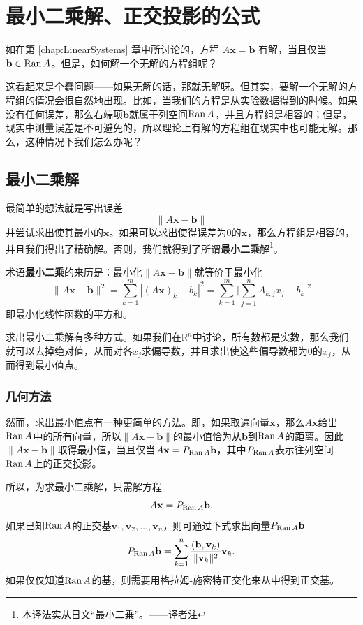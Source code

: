 \section{最小二乘解、正交投影的公式}\label{sec:least_square}

如在第 \ref{chap:LinearSystems} 章中所讨论的，方程%
$A\mathbf{x}=\mathbf{b}$
有解，当且仅当$\mathbf{b}\in\operatorname{Ran} A$。但是，如何解一个无解的方程组呢？

这看起来是个蠢问题——如果无解的话，那就无解呀。但其实，要解一个无解的方程组的情况会很自然地出现。比如，当我们的方程是从实验数据得到的时候。如果没有任何误差，那么右端项$\mathbf{b}$就属于列空间$\operatorname{Ran} A$，并且方程组是相容的；但是，现实中测量误差是不可避免的，所以理论上有解的方程组在现实中也可能无解。那么，这种情况下我们怎么办呢？

\subsection{最小二乘解}

最简单的想法就是写出误差\[\|A\mathbf{x}-\mathbf{b}\|\]
并尝试求出使其最小的$\mathbf{x}$。如果可以求出使得误差为$0$的$\mathbf{x}$，那么方程组是相容的，并且我们得出了精确解。否则，我们就得到了所谓\textbf{最小二乘}解\footnote{本译法实从日文“最小二{\gothic 乗}”。——译者注}。

术语\textbf{最小二乘}的来历是：最小化$\|A\mathbf{x}-\mathbf{b}\|$就等价于最小化
\[\|A\mathbf{x}-\mathbf{b}\|^2=\sum_{k=1}^m|(A\mathbf{x})_k-b_k|^2=\sum_{k=1}^m\biggl|\sum_{j=1}^nA_{k,j}x_j-b_k\biggr|^2\]
即最小化线性函数的平方和。

求出最小二乘解有多种方式。如果我们在$\mathbb{R}^n$中讨论，所有数都是实数，那么我们就可以去掉绝对值，从而对各$x_j$求偏导数，并且求出使这些偏导数都为$0$的$x_j$，从而得到最小值点。

\subsubsection{几何方法}

然而，求出最小值点有一种更简单的方法。即，如果取遍向量$\mathbf{x}$，那么$A\mathbf{x}$给出$\operatorname{Ran} A$中的所有向量，所以$\|A\mathbf{x}-\mathbf{b}\|$的最小值恰为从$\mathbf{b}$到$\operatorname{Ran} A$的距离。因此$\|A\mathbf{x}-\mathbf{b}\|$取得最小值，当且仅当$A\mathbf{x}=P_{\operatorname{Ran} A}\mathbf{b}$，其中$P_{\operatorname{Ran} A}$表示往列空间$\operatorname{Ran} A$上的正交投影。

所以，为求最小二乘解，只需解方程\[A\mathbf{x}=P_{\operatorname{Ran} A}\mathbf{b}.\]
如果已知$\operatorname{Ran} A$的正交基$\mathbf{v}_{1},\mathbf{v}_{2},\ldots,\mathbf{v}_{n}$，则可通过下式求出向量$P_{\operatorname{Ran} A}\mathbf{b}$
\[P_{\operatorname{Ran} A}\mathbf{b}=\sum_{k=1}^{n}\frac{(\mathbf{b},\mathbf{v}_{k})}{\|\mathbf{v}_{k}\|^{2}}\mathbf{v}_{k}.\]
如果仅仅知道$\operatorname{Ran} A$的基，则需要用格拉姆-施密特正交化来从中得到正交基。


